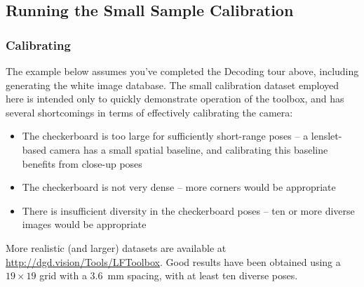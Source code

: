 \documentclass[onecolumn]{article}
\begin{document}
\subsection{Running the Small Sample Calibration}
\subsubsection{Calibrating}

The example below assumes you've completed the Decoding tour above, including generating the white image database. The small calibration dataset employed here is intended only to quickly demonstrate operation of the toolbox, and has several shortcomings in terms of effectively calibrating the camera:

\begin{itemize}
\item The checkerboard is too large for sufficiently short-range poses -- a lenslet-based camera has a small spatial baseline, and calibrating this baseline benefits from close-up poses
\item The checkerboard is not very dense -- more corners would be appropriate
\item There is insufficient diversity in the checkerboard poses -- ten or more diverse images would be appropriate
\end{itemize}

More realistic (and larger) datasets are available at \url{http://dgd.vision/Tools/LFToolbox}. Good results have been obtained using a $19 \times 19$ grid with a 3.6~mm spacing, with at least ten diverse poses.
\end{document}

